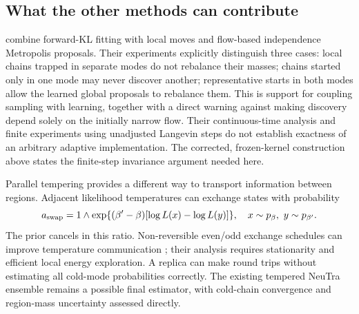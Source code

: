 \subsection{What the other methods can contribute}

\citet[Equation 8, Algorithm 1 and Appendix G.1]{gabrie2022adaptiveflows}
combine forward-KL fitting with local moves and flow-based independence
Metropolis proposals. Their experiments explicitly distinguish three cases:
local chains trapped in separate modes do not rebalance their masses; chains
started only in one mode may never discover another; representative starts
in both modes allow the learned global proposals to rebalance them. This is
support for coupling sampling with learning, together with a direct warning
against making discovery depend solely on the initially narrow flow. Their
continuous-time analysis and finite experiments using unadjusted Langevin
steps do not establish exactness of an arbitrary adaptive implementation.
The corrected, frozen-kernel construction above states the finite-step
invariance argument needed here.

Parallel tempering provides a different way to transport information between
regions. Adjacent likelihood temperatures can exchange states with probability
\begin{equation}
 a_{\rm swap}=1\wedge
 \exp\{(\beta'-\beta)[\log L(x)-\log L(y)]\},
 \quad x\sim p_\beta,\ y\sim p_{\beta'}.
 \label{eq:bf-is-posterior-swap}
\end{equation}
The prior cancels in this ratio. Non-reversible even/odd exchange schedules
can improve temperature communication
\citep[Section 2.3 and assumptions A1--A3]{syed2022nrpt}; their analysis
requires stationarity and efficient local energy exploration. A replica can
make round trips without estimating all cold-mode probabilities correctly.
The existing tempered NeuTra ensemble remains a possible final estimator,
with cold-chain convergence and region-mass uncertainty assessed directly.


